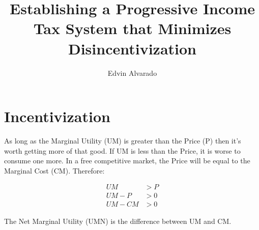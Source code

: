 \documentclass[12pt,letterpaper]{article}
\author{Edvin Alvarado}
\title{Establishing a Progressive Income Tax System that Minimizes Disincentivization}
\begin{document}
	
		
		
		
		
	\maketitle
	
		
	\section{Incentivization} 
	
		As long as the Marginal Utility (UM) is greater than the Price (P) then it's worth getting more of that good. If UM is less than the Price, it is worse to consume one more. In a free competitive market, the Price will be equal to the Marginal Cost (CM). Therefore:

		\begin{align*}
			UM&>P \\
			UM-P&>0 \\
			UM-CM&>0
		\end{align*}

		The Net Marginal Utility (UMN) is the difference between UM and CM.
\end{document}
